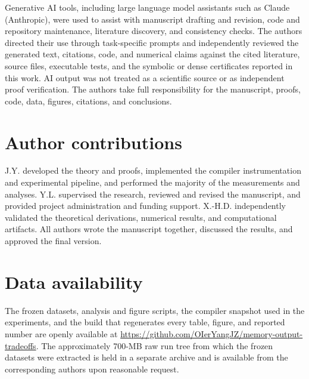 \documentclass[aps,prx,reprint,superscriptaddress,floatfix,longbibliography]{revtex4-2}
\begin{document}
\begin{acknowledgements}
\begingroup
{}
Generative AI tools, including large language model assistants such as
Claude (Anthropic), were used to assist with manuscript drafting and
revision, code and repository maintenance, literature discovery, and
consistency checks.  The authors directed their use through task-specific
prompts and independently reviewed the generated text, citations, code, and
numerical claims against the cited literature, source files, executable tests,
and the symbolic or dense certificates reported in this work.  AI output was
not treated as a scientific source or as independent proof verification.  The
authors take full responsibility for the manuscript, proofs, code, data,
figures, citations, and conclusions.\par
\endgroup
\end{acknowledgements}

\section*{Author contributions}

J.Y. developed the theory and proofs, implemented the compiler instrumentation
and experimental pipeline, and performed the majority of the measurements and
analyses.  Y.L. supervised the research, reviewed and revised the manuscript,
and provided project administration and funding support.  X.-H.D.
independently validated the theoretical derivations, numerical results, and
computational artifacts.  All authors wrote the manuscript together,
discussed the results, and approved the final version.

\ifdefined\PRRSubmissionVersion
\section*{Data availability}

The frozen datasets, analysis and figure scripts, the compiler snapshot used
in the experiments, and the build that regenerates every table, figure, and
reported number are openly available at
\url{https://github.com/OIerYangJZ/memory-output-tradeoffs}.  The
approximately 700-MB raw run tree from which the frozen datasets were
extracted is held in a separate archive and is available from the
corresponding authors upon reasonable request.

\appendix



\else



\appendix

\fi
\end{document}
